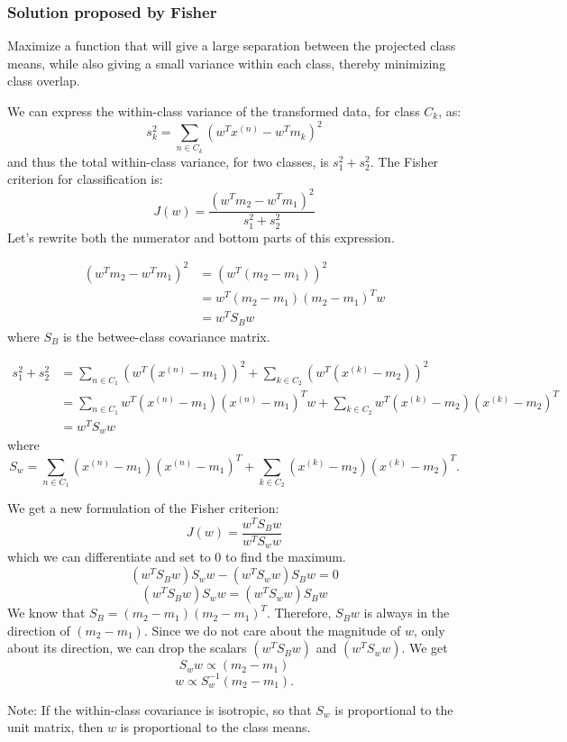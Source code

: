 \documentclass[a4paper,12pt]{article}
\begin{document}
\subsubsection{Solution proposed by Fisher}

Maximize a function that will give a large separation between the projected class means, while also giving a small variance within each class, thereby minimizing class overlap. 

We can express the within-class variance of the transformed data, for class $C_k$, as: 
$$s_k^2 = \sum_{n\in C_k} (w^Tx^{(n)} - w^T m_k)^2$$
and thus the total within-class variance, for two classes, is $s_1^2 + s_2^2$. The Fisher criterion for classification is: 
$$J(w) = \frac{(w^Tm_2 - w^Tm_1)^2}{s_1^2 + s_2^2}$$
Let's rewrite both the numerator and bottom parts of this expression. 

\begin{align*}
(w^Tm_2 - w^Tm_1)^2 &= (w^T(m_2 - m_1))^2 \\
					&= w^T(m_2 - m_1)(m_2 - m_1)^Tw\\
					&= w^TS_Bw
\end{align*}
where $S_B$ is the betwee-class covariance matrix. 

\begin{align*}
s_1^2 + s_2^2 &= \sum_{n\in C_1} \left(w^T(x^{(n)} - m_1)\right)^2
				+ \sum_{k\in C_2} \left(w^T(x^{(k)} - m_2)\right)^2 \\
			&= \sum_{n\in C_1} w^T (x^{(n)} - m_1)(x^{(n)} - m_1)^Tw 
				+ \sum_{k\in C_2} w^T (x^{(k)} - m_2)(x^{(k)} - m_2)^T \\
			&= w^TS_ww
\end{align*}
where 
$$S_w = \sum_{n\in C_1} (x^{(n)} - m_1)(x^{(n)} - m_1)^T + \sum_{k\in C_2} (x^{(k)} - m_2)(x^{(k)} - m_2)^T.$$

We get a new formulation of the Fisher criterion: 
$$J(w) = \frac{w^TS_Bw}{w^TS_ww}$$
which we can differentiate and set to 0 to find the maximum. 
$$(w^TS_Bw)S_ww - (w^TS_ww)S_Bw = 0$$
$$(w^TS_Bw)S_ww = (w^TS_ww)S_Bw$$
We know that $S_B = (m_2-m_1)(m_2-m_1)^T$. Therefore, $S_Bw$ is always in the direction of $(m_2-m_1)$. Since we do not care about the magnitude of $w$, only about its direction, we can drop the scalars $(w^TS_Bw)$ and $(w^TS_ww)$. We get 
$$S_ww \propto (m_2 - m_1)$$ 
$$w \propto S_w^{-1}(m_2 - m_1).$$

Note: If the within-class covariance is isotropic, so that $S_w$ is proportional to the unit matrix, then $w$ is proportional to the class means. 
\end{document}
